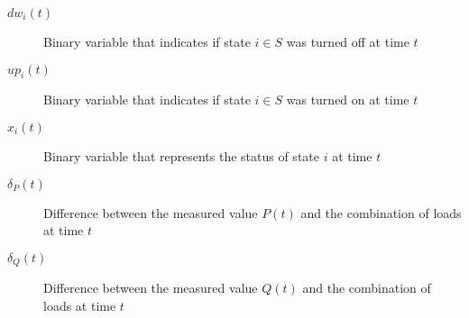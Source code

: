\begin{description}
    \item [{$dw_i(t)$}]         Binary variable that indicates if state $i \in S$ was turned off at time $t$
    \item [{$up_i(t)$}]         Binary variable that indicates if state $i \in S$ was turned on at time $t$ 
    \item [{$x_{i}(t)$}]        Binary variable that represents the status of state $i$ at time $t$
    \item [{$\delta_P(t)$}]     Difference between the measured value $P(t)$ and the combination of loads at time $t$
    \item [{$\delta_Q(t)$}]     Difference between the measured value $Q(t)$ and the combination of loads at time $t$
    
\end{description}
